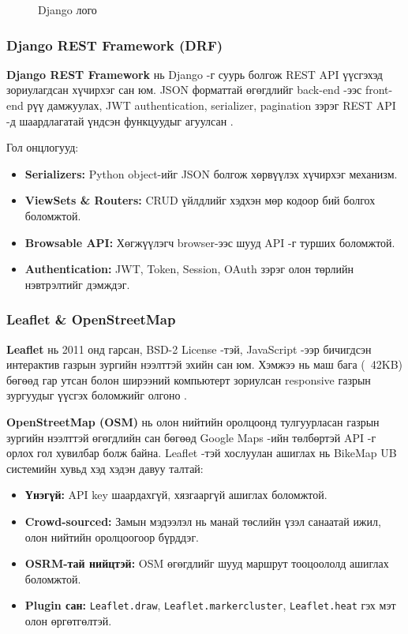 \begin{figure}[H]
    \centering
    \caption{Django лого}
    \label{fig:django-logo}
\end{figure}

\subsubsection{Django REST Framework (DRF)}
\par
\textbf{Django REST Framework} нь Django -г суурь болгож REST API үүсгэхэд зориулагдсан хүчирхэг сан юм. JSON форматтай өгөгдлийг back-end -ээс front-end рүү дамжуулах, JWT authentication, serializer, pagination зэрэг REST API -д шаардлагатай үндсэн функцуудыг агуулсан \cite{drf}.

\par Гол онцлогууд:
\begin{itemize}
    \item \textbf{Serializers: }Python object-ийг JSON болгож хөрвүүлэх хүчирхэг механизм.
    \item \textbf{ViewSets \& Routers: }CRUD үйлдлийг хэдхэн мөр кодоор бий болгох боломжтой.
    \item \textbf{Browsable API: }Хөгжүүлэгч browser-ээс шууд API -г турших боломжтой.
    \item \textbf{Authentication: }JWT, Token, Session, OAuth зэрэг олон төрлийн нэвтрэлтийг дэмждэг.
\end{itemize}

\subsubsection{Leaflet \& OpenStreetMap}
\par
\textbf{Leaflet} нь 2011 онд гарсан, BSD-2 License -тэй, JavaScript -ээр бичигдсэн интерактив газрын зургийн нээлттэй эхийн сан юм. Хэмжээ нь маш бага (~42KB) бөгөөд гар утсан болон ширээний компьютерт зориулсан responsive газрын зургуудыг үүсгэх боломжийг олгоно \cite{leaflet}.

\par \textbf{OpenStreetMap (OSM)} нь олон нийтийн оролцоонд тулгуурласан газрын зургийн нээлттэй өгөгдлийн сан бөгөөд Google Maps -ийн төлбөртэй API -г орлох гол хувилбар болж байна. Leaflet -тэй хослуулан ашиглах нь BikeMap UB системийн хувьд хэд хэдэн давуу талтай:
\begin{itemize}
    \item \textbf{Үнэгүй: }API key шаардахгүй, хязгааргүй ашиглах боломжтой.
    \item \textbf{Crowd-sourced: }Замын мэдээлэл нь манай төслийн үзэл санаатай ижил, олон нийтийн оролцоогоор бүрддэг.
    \item \textbf{OSRM-тай нийцтэй: }OSM өгөгдлийг шууд маршрут тооцоололд ашиглах боломжтой.
    \item \textbf{Plugin сан: }\texttt{Leaflet.draw}, \texttt{Leaflet.markercluster}, \texttt{Leaflet.heat} гэх мэт олон өргөтгөлтэй.
\end{itemize}

